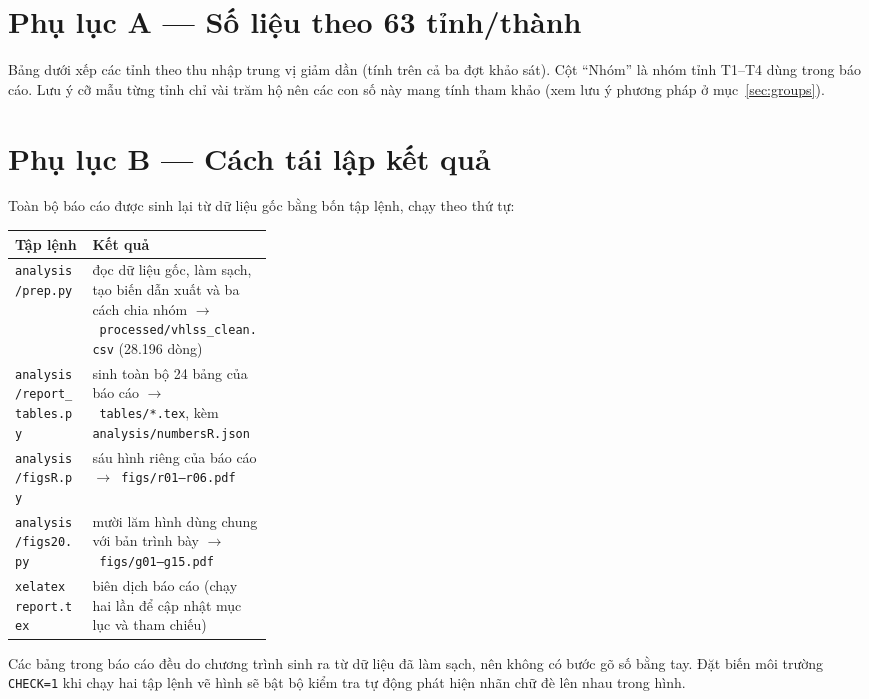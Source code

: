 \documentclass[11pt,a4paper]{article}
\newcommand{\ra}{$\rightarrow$}
\newcommand{\tblfit}[1]{\resizebox{\linewidth}{!}{}}
\begin{document}
\appendix
\section{Phụ lục A — Số liệu theo 63 tỉnh/thành}

Bảng dưới xếp các tỉnh theo thu nhập trung vị giảm dần (tính trên cả ba đợt khảo sát). Cột “Nhóm” là nhóm tỉnh T1–T4 dùng trong báo cáo. Lưu ý cỡ mẫu từng tỉnh chỉ vài trăm hộ nên các con số này mang tính tham khảo (xem lưu ý phương pháp ở mục~\ref{sec:groups}).

\begin{center}
\footnotesize
\begin{minipage}[t]{0.48\linewidth}\centering\tblfit{t_prov_a}\end{minipage}\hfill
\begin{minipage}[t]{0.48\linewidth}\centering\tblfit{t_prov_b}\end{minipage}
\end{center}

\section{Phụ lục B — Cách tái lập kết quả}\label{app:repro}

Toàn bộ báo cáo được sinh lại từ dữ liệu gốc bằng bốn tập lệnh, chạy theo thứ tự:

\begin{center}\small
\begin{tabularx}{\linewidth}{@{}p{0.30\linewidth}X@{}}
\toprule
\textbf{Tập lệnh} & \textbf{Kết quả}\\
\midrule
\texttt{analysis/prep.py} & đọc dữ liệu gốc, làm sạch, tạo biến dẫn xuất và ba cách chia nhóm \ra\ \texttt{processed/vhlss\_clean.csv} (28.196 dòng)\\
\texttt{analysis/report\_tables.py} & sinh toàn bộ 24 bảng của báo cáo \ra\ \texttt{tables/*.tex}, kèm \texttt{analysis/numbersR.json}\\
\texttt{analysis/figsR.py} & sáu hình riêng của báo cáo \ra\ \texttt{figs/r01–r06.pdf}\\
\texttt{analysis/figs20.py} & mười lăm hình dùng chung với bản trình bày \ra\ \texttt{figs/g01–g15.pdf}\\
\texttt{xelatex report.tex} & biên dịch báo cáo (chạy hai lần để cập nhật mục lục và tham chiếu)\\
\bottomrule
\end{tabularx}
\end{center}

Các bảng trong báo cáo đều do chương trình sinh ra từ dữ liệu đã làm sạch, nên không có bước gõ số bằng tay. Đặt biến môi trường \texttt{CHECK=1} khi chạy hai tập lệnh vẽ hình sẽ bật bộ kiểm tra tự động phát hiện nhãn chữ đè lên nhau trong hình.
\end{document}
